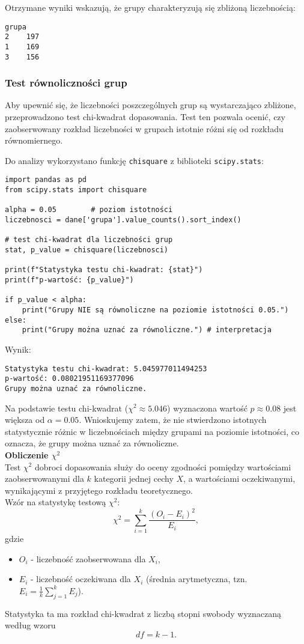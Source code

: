 \documentclass[12pt,a4paper]{article}
\begin{document}
Otrzymane wyniki wskazują, że grupy charakteryzują się zbliżoną liczebnością:
\begin{lstlisting}
grupa
2    197
1    169
3    156
\end{lstlisting}

\subsubsection{Test równoliczności grup}

Aby upewnić się, że liczebności poszczególnych grup są wystarczająco zbliżone, przeprowadzono test chi-kwadrat dopasowania. Test ten pozwala ocenić, czy zaobserwowany rozkład liczebności w grupach istotnie różni się od rozkładu równomiernego.

Do analizy wykorzystano funkcję \texttt{chisquare} z biblioteki \texttt{scipy.stats}:

\begin{lstlisting}
import pandas as pd
from scipy.stats import chisquare

alpha = 0.05        # poziom istotności
liczebnosci = dane['grupa'].value_counts().sort_index()

# test chi-kwadrat dla liczebności grup
stat, p_value = chisquare(liczebnosci)

print(f"Statystyka testu chi-kwadrat: {stat}")
print(f"p-wartość: {p_value}")

if p_value < alpha:
    print("Grupy NIE są równoliczne na poziomie istotności 0.05.")
else:
    print("Grupy można uznać za równoliczne.") # interpretacja
\end{lstlisting}
\newpage
Wynik:
\begin{lstlisting}
Statystyka testu chi-kwadrat: 5.045977011494253
p-wartość: 0.08021951169377096
Grupy można uznać za równoliczne.
\end{lstlisting}
Na podstawie testu chi-kwadrat ($\chi^2\approx5.046$) wyznaczona wartość  $p\approx0.08$ jest większa od $\alpha=0.05$. Wnioskujemy zatem, że nie stwierdzono istotnych statystycznie różnic w liczebnościach między grupami na poziomie istotności, co oznacza, że grupy można uznać za równoliczne.
\\

\textbf{Obliczenie $\chi^2$}
\\

Test $\chi^2$ dobroci dopasowania służy do oceny zgodności pomiędzy wartościami zaobserwowanymi dla $k$ kategorii jednej cechy $X$, a wartościami oczekiwanymi, wynikającymi z przyjętego rozkładu teoretycznego.
\\
Wzór na statystykę testową $\chi^2$:
$$\chi^2 = \sum_{i=1}^{k} \frac{(O_i - E_i)^2}{E_i},$$
gdzie
\begin{itemize}
    \item $O_i$ - liczebność zaobserwowana dla $X_i$,
    \item $E_i$ - liczebność oczekiwana dla $X_i$ (średnia arytmetyczna, tzn. $E_i=\frac{1}{k}\sum_{j=1}^{k}E_j$).
\end{itemize}
Statystyka ta ma  rozkład chi-kwadrat z liczbą stopni swobody wyznaczaną według wzoru $$df=k-1.$$
\end{document}
